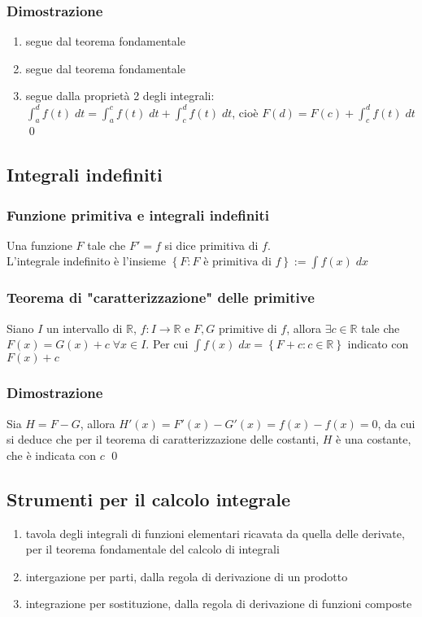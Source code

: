 \documentclass[a4paper]{article}
\begin{document}
\subsubsection*{Dimostrazione}
\begin{enumerate}
	\item segue dal teorema fondamentale
	\item segue dal teorema fondamentale
	\item segue dalla proprietà 2 degli integrali: \\
	\(\displaystyle \int_{a}^{d} f(t)\; dt = \int_{a}^{c} f(t)\; dt + \int_{c}^{d} f(t)\; dt\), cioè \(\displaystyle F(d) = F(c) + \int_{c}^{d} f(t)\; dt\) \qed
\end{enumerate}

\subsection{Integrali indefiniti}
\subsubsection*{Funzione primitiva e integrali indefiniti}
Una funzione \(F\) tale che \(F' = f\) si dice primitiva di \(f\). \\
L'integrale indefinito è l'insieme \(\displaystyle\left\{F : F \text{ è primitiva di } f\right\} := \int f(x) \; dx\)

\subsubsection*{Teorema di "caratterizzazione" delle primitive}
Siano \(I\) un intervallo di \(\mathbb{R}\), \(f:I \to \mathbb{R}\) e \(F, G\) primitive di \(f\), allora \(\exists c \in \mathbb{R}\)
tale che \(F(x) = G(x) + c \; \forall x \in I\). 
Per cui \(\displaystyle \int f(x) \; dx = \left\{F + c : c \in \mathbb{R}\right\}\) indicato con \(F(x) + c\)

\subsubsection*{Dimostrazione}
Sia \(H = F - G\), allora \(H'(x) = F'(x) - G'(x) = f(x) - f(x) = 0\), da cui si deduce che per il teorema di caratterizzazione delle costanti,
\(H\) è una costante, che è indicata con \(c\) \qed

\subsection{Strumenti per il calcolo integrale}
\begin{enumerate}
	\item tavola degli integrali di funzioni elementari ricavata da quella delle derivate, per il teorema fondamentale del calcolo di integrali
	\item intergazione per parti, dalla regola di derivazione di un prodotto
	\item integrazione per sostituzione, dalla regola di derivazione di funzioni composte
\end{enumerate}
\end{document}
